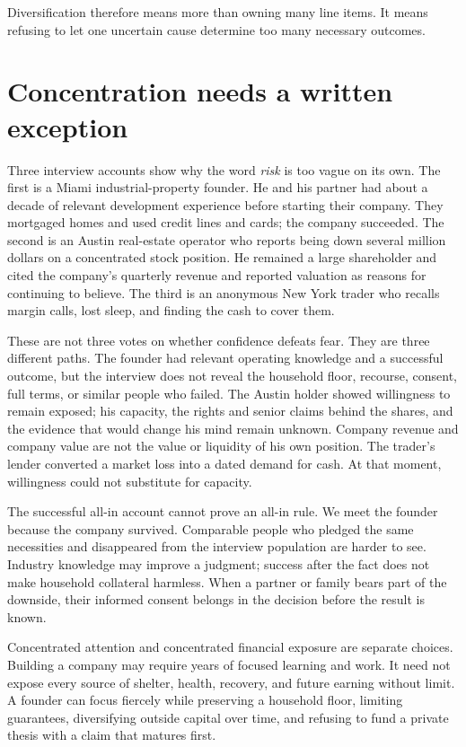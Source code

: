 Diversification therefore means more than owning many line items. It means
refusing to let one uncertain cause determine too many necessary outcomes.

\section{Concentration needs a written exception}

Three interview accounts show why the word \emph{risk} is too vague on its own.
The first is a Miami industrial-property founder. He and his partner had about
a decade of relevant development experience before starting their company.
They mortgaged homes and used credit lines and cards; the company succeeded.
The second is an Austin real-estate operator who reports being down several
million dollars on a concentrated stock position. He remained a large
shareholder and cited the company's quarterly revenue and reported valuation
as reasons for continuing to believe. The third is an anonymous New York
trader who recalls margin calls, lost sleep, and finding the cash to cover them.

These are not three votes on whether confidence defeats fear. They are three
different paths. The founder had relevant operating knowledge and a successful
outcome, but the interview does not reveal the household floor, recourse,
consent, full terms, or similar people who failed. The Austin holder showed
willingness to remain exposed; his capacity, the rights and senior claims
behind the shares, and the evidence that would change his mind remain unknown.
Company revenue and company value are not the value or liquidity of his own
position. The trader's lender converted a market loss into a dated demand for
cash. At that moment, willingness could not substitute for capacity.

The successful all-in account cannot prove an all-in rule. We meet the founder
because the company survived. Comparable people who pledged the same
necessities and disappeared from the interview population are harder to see.
Industry knowledge may improve a judgment; success after the fact does not
make household collateral harmless. When a partner or family bears part of the
downside, their informed consent belongs in the decision before the result is
known.

Concentrated attention and concentrated financial exposure are separate
choices. Building a company may require years of focused learning and work.
It need not expose every source of shelter, health, recovery, and future
earning without limit. A founder can focus fiercely while preserving a
household floor, limiting guarantees, diversifying outside capital over time,
and refusing to fund a private thesis with a claim that matures first.

